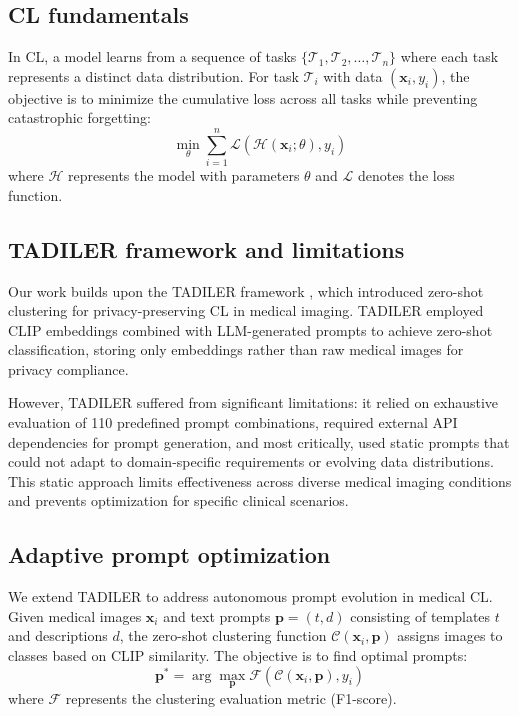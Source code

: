 \documentclass[pdflatex,sn-mathphys-num]{sn-jnl}%
\theoremstyle{thmstyleone}%
\theoremstyle{thmstyletwo}%
\theoremstyle{thmstylethree}%
\begin{document}
\subsection{CL fundamentals}
In CL, a model learns from a sequence of tasks $\{\mathcal{T}_1, \mathcal{T}_2, \ldots, \mathcal{T}_n\}$ where each task represents a distinct data distribution. For task $\mathcal{T}_i$ with data $(\mathbf{x}_i, y_i)$, the objective is to minimize the cumulative loss across all tasks while preventing catastrophic forgetting:
\begin{equation}
\min_{\theta} \sum_{i=1}^{n} \mathcal{L}(\mathcal{H}(\mathbf{x}_i; \theta), y_i)
\end{equation}
where $\mathcal{H}$ represents the model with parameters $\theta$ and $\mathcal{L}$ denotes the loss function.

\subsection{TADILER framework and limitations}
Our work builds upon the TADILER framework \cite{BravoRocca2025}, which introduced zero-shot clustering for privacy-preserving CL in medical imaging. TADILER employed CLIP embeddings combined with LLM-generated prompts to achieve zero-shot classification, storing only embeddings rather than raw medical images for privacy compliance. 

However, TADILER suffered from significant limitations: it relied on exhaustive evaluation of 110 predefined prompt combinations, required external API dependencies for prompt generation, and most critically, used static prompts that could not adapt to domain-specific requirements or evolving data distributions. This static approach limits effectiveness across diverse medical imaging conditions and prevents optimization for specific clinical scenarios.

\subsection{Adaptive prompt optimization}
We extend TADILER to address autonomous prompt evolution in medical CL. Given medical images $\mathbf{x}_i$ and text prompts $\mathbf{p} = (t, d)$ consisting of templates $t$ and descriptions $d$, the zero-shot clustering function $\mathcal{C}(\mathbf{x}_i, \mathbf{p})$ assigns images to classes based on CLIP similarity. The objective is to find optimal prompts:
\begin{equation}
\mathbf{p}^* = \arg\max_{\mathbf{p}} \mathcal{F}(\mathcal{C}(\mathbf{x}_i, \mathbf{p}), y_i)
\end{equation}
where $\mathcal{F}$ represents the clustering evaluation metric (F1-score).
\end{document}

